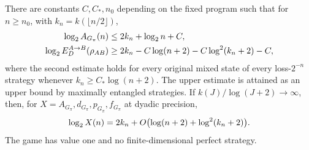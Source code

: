 \begin{theorem}\label{thm:profile}
There are constants $C,C_*,n_0$ depending on the fixed program such that for $n\ge n_0$, with $k_n=k(\lfloor n/2\rfloor)$,
\begin{align}
 \log_2 A_{G_\pi}(n)&\le2k_n+\log_2 n+C,\label{eq:upper-profile}\\
 \log_2E_D^{A\to B}(\rho_{AB})&\ge2k_n-C\log(n+2)
       -C\log^2(k_n+2)-C,\label{eq:lower-profile}
\end{align}
where the second estimate holds for every original mixed state of every loss-$2^{-n}$ strategy whenever $k_n\ge C_*\log(n+2)$. The upper estimate is attained as an upper bound by maximally entangled strategies. If $k(J)/\log(J+2)\to\infty$, then, for $X=A_{G_\pi},d_{G_\pi},p_{G_\pi},f_{G_\pi}$ at dyadic precision,
\begin{equation}\label{eq:profile}
 \log_2 X(n)=2k_n+O\bigl(\log(n+2)+\log^2(k_n+2)\bigr).
\end{equation}
The game has value one and no finite-dimensional perfect strategy.
\end{theorem}
